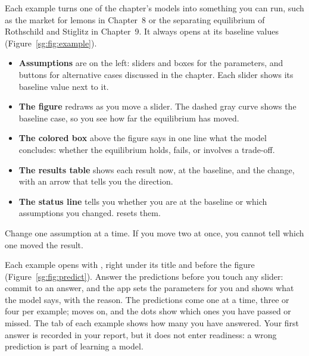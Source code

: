 Each example turns one of the chapter's models into something you can run, such as the market for lemons in Chapter~8 or the separating equilibrium of Rothschild and Stiglitz in Chapter~9. It always opens at its baseline values (Figure~\ref{sg:fig:example}).
\begin{itemize}
  \item \textbf{Assumptions} are on the left: sliders and boxes for the parameters, and buttons for alternative cases discussed in the chapter. Each slider shows its baseline value next to it.
  \item \textbf{The figure} redraws as you move a slider. The dashed gray curve shows the baseline case, so you see how far the equilibrium has moved.
  \item \textbf{The colored box} above the figure says in one line what the model concludes: whether the equilibrium holds, fails, or involves a trade-off.
  \item \textbf{The results table} shows each result now, at the baseline, and the change, with an arrow that tells you the direction.
  \item \textbf{The status line} tells you whether you are at the baseline or which assumptions you changed.  resets them.
\end{itemize}
Change one assumption at a time. If you move two at once, you cannot tell which one moved the result.

Each example opens with , right under its title and before the figure (Figure~\ref{sg:fig:predict}). Answer the predictions before you touch any slider: commit to an answer, and the app sets the parameters for you and shows what the model says, with the reason. The predictions come one at a time, three or four per example;  moves on, and the dots show which ones you have passed or missed. The tab of each example shows how many you have answered. Your first answer is recorded in your report, but it does not enter readiness: a wrong prediction is part of learning a model.




